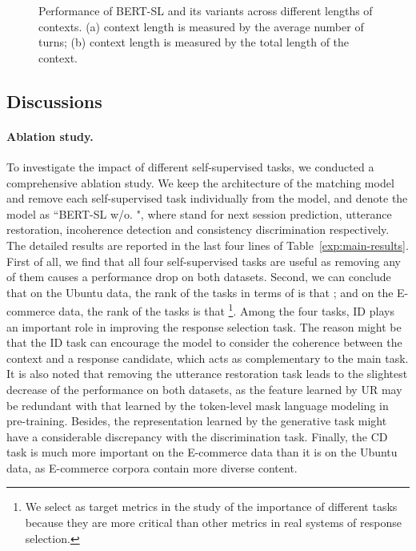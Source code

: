 \documentclass{article}
\begin{document}
\begin{figure*}[h!]
  \centering
  \caption{Performance of BERT-SL and its variants across different lengths of contexts. (a) context length is measured by the average number of turns; (b) context length is measured by the total length of the context.}
  \label{fig:context-length}
\end{figure*}

\subsection{Discussions}
\paragraph{Ablation study.}
To investigate the impact of different self-supervised tasks, we conducted a  comprehensive ablation study. 
We keep the architecture of the matching model and remove each self-supervised task individually from the model, and denote the model as ``{BERT-SL} w/o. ", where  stand for next session prediction, utterance restoration, incoherence detection and  consistency discrimination respectively.
The detailed results are reported in the last four lines of Table~\ref{exp:main-results}.
First of all, we find that all four self-supervised tasks are useful as removing any of them causes a performance drop on both datasets.
Second, we can conclude that on the Ubuntu data, the rank of the tasks in terms of  is that ; and on the E-commerce data, the rank of the tasks is that \footnote{We select  as target metrics in the study of the importance of different tasks because they are more critical than other metrics in real systems of response selection.}.
Among the four tasks, ID plays an important role in improving the response selection task. The reason might be that the ID task can encourage the model to consider the coherence between the context and a response candidate, which acts as complementary to the main task.
It is also noted that removing the utterance restoration task leads to the slightest decrease of the performance 
on both datasets, 
as the feature learned by UR may be redundant with that learned by the token-level mask language modeling in pre-training. Besides, the representation learned by the generative task might have a considerable discrepancy with the discrimination task.
Finally, the CD task is much more important on the E-commerce data than it is on the Ubuntu data, as E-commerce corpora contain more diverse content.
\end{document}
